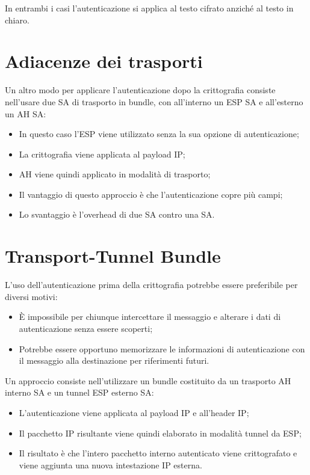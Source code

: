 In entrambi i casi l'autenticazione si applica al testo cifrato anziché al testo in chiaro.

\section{Adiacenze dei trasporti}

Un altro modo per applicare l'autenticazione dopo la crittografia consiste nell'usare due SA di trasporto in bundle, con all'interno un ESP SA e all'esterno un AH SA:
\begin{itemize}
    \item In questo caso l'ESP viene utilizzato senza la sua opzione di autenticazione;
	\item La crittografia viene applicata al payload IP;
	\item AH viene quindi applicato in modalità di trasporto;
	\item Il vantaggio di questo approccio è che l'autenticazione copre più campi;
	\item Lo svantaggio è l'overhead di due SA contro una SA.
\end{itemize}

\section{Transport-Tunnel Bundle}

L'uso dell'autenticazione prima della crittografia potrebbe essere preferibile per diversi motivi:
\begin{itemize}
    \item È impossibile per chiunque intercettare il messaggio e alterare i dati di autenticazione senza essere scoperti;
	\item Potrebbe essere opportuno memorizzare le informazioni di autenticazione con il messaggio alla destinazione per riferimenti futuri.
\end{itemize}

Un approccio consiste nell'utilizzare un bundle costituito da un trasporto AH interno SA e un tunnel ESP esterno SA:
\begin{itemize}
    \item L'autenticazione viene applicata al payload IP e all'header IP;
	\item Il pacchetto IP risultante viene quindi elaborato in modalità tunnel da ESP;
	\item Il risultato è che l'intero pacchetto interno autenticato viene crittografato e viene aggiunta una nuova intestazione IP esterna.
\end{itemize}






